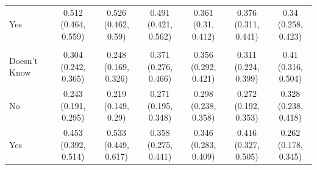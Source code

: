\documentclass[
]{article}
\begin{document}
\begin{table}
\begin{tabular}[t]{lcccccc}
\hspace{1em}Yes & \makecell[c]{0.512\\(0.464, 0.559)} & \makecell[c]{0.526\\(0.462, 0.59)} & \makecell[c]{0.491\\(0.421, 0.562)} & \makecell[c]{0.361\\(0.31, 0.412)} & \makecell[c]{0.376\\(0.311, 0.441)} & \makecell[c]{0.34\\(0.258, 0.423)}\\
\addlinespace[0.3em]
\hline
\multicolumn{7}{l}{\textbf{Control}}\\
\hline
\hspace{1em}Doesn't Know & \makecell[c]{0.304\\(0.242, 0.365)} & \makecell[c]{0.248\\(0.169, 0.326)} & \makecell[c]{0.371\\(0.276, 0.466)} & \makecell[c]{0.356\\(0.292, 0.421)} & \makecell[c]{0.311\\(0.224, 0.399)} & \makecell[c]{0.41\\(0.316, 0.504)}\\
\hspace{1em}No & \makecell[c]{0.243\\(0.191, 0.295)} & \makecell[c]{0.219\\(0.149, 0.29)} & \makecell[c]{0.271\\(0.195, 0.348)} & \makecell[c]{0.298\\(0.238, 0.358)} & \makecell[c]{0.272\\(0.192, 0.353)} & \makecell[c]{0.328\\(0.238, 0.418)}\\
\hspace{1em}Yes & \makecell[c]{0.453\\(0.392, 0.514)} & \makecell[c]{0.533\\(0.449, 0.617)} & \makecell[c]{0.358\\(0.275, 0.441)} & \makecell[c]{0.346\\(0.283, 0.409)} & \makecell[c]{0.416\\(0.327, 0.505)} & \makecell[c]{0.262\\(0.178, 0.345)}\\
\bottomrule
\end{tabular}
\end{table}
\end{document}

